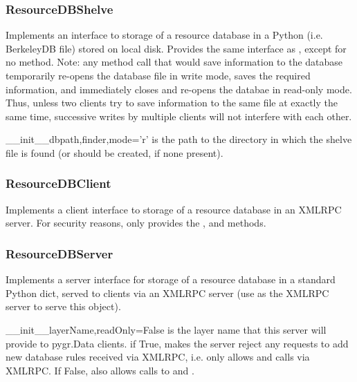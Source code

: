 \documentclass{howto}
\begin{document}
\subsubsection{ResourceDBShelve}
Implements an interface to storage of a resource database in a Python
 (i.e. BerkeleyDB file) stored on local disk.
Provides the same interface as , except for
no  method.  Note: any method call that would
save information to the database temporarily re-opens the database
file in write mode, saves the required information, and immediately
closes and re-opens
the databae in read-only mode.  Thus, unless two clients try
to save information to the same file at exactly the same time,
successive writes by multiple clients will not interfere with each
other.
\begin{funcdesc}{__init__}{dbpath,finder,mode='r'}
   is the path to the directory in which the shelve
  file is found (or should be created, if none present).
\end{funcdesc}

\subsubsection{ResourceDBClient}
Implements a client interface to storage of a resource database in an XMLRPC
server.  For security reasons, only provides the ,
and  methods.

\subsubsection{ResourceDBServer}
Implements a server interface for storage of a resource database in 
a standard Python dict, served to clients via an XMLRPC
server (use  as the XMLRPC
server to serve this object).  

\begin{funcdesc}{__init__}{layerName,readOnly=False}
   is the layer name that this server will provide
  to pygr.Data clients.   if True, makes the server reject
  any requests to add new database rules received via XMLRPC, i.e.
  only allows  and  calls via XMLRPC.
  If False, also allows calls to  and .
\end{funcdesc}
\end{document}
